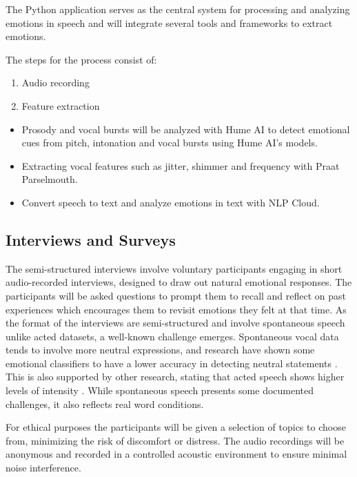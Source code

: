 The Python application serves as the central system for processing and analyzing emotions in speech and will integrate several tools and frameworks to extract emotions.

The steps for the process consist of:

\begin{enumerate}
    \item Audio recording
    \item Feature extraction
\end{enumerate}

\begin{itemize}
    \item Prosody and vocal bursts will be analyzed with Hume AI to detect emotional cues from pitch, intonation and vocal bursts using Hume AI’s models.
    \item Extracting vocal features such as jitter, shimmer and frequency with Praat Parselmouth.
    \item Convert speech to text and analyze emotions in text with NLP Cloud.
\end{itemize}


\subsection{Interviews and Surveys}
\label{sec:theo-interviews}

The semi-structured interviews involve voluntary participants engaging in short audio-recorded interviews, designed to draw out natural emotional responses. The participants will be asked questions to prompt them to recall and reflect on past experiences which encourages them to revisit emotions they felt at that time. 
As the format of the interviews are semi-structured and involve spontaneous speech unlike acted datasets, a well-known challenge emerges. Spontaneous vocal data tends to involve more neutral expressions, and research have shown some emotional classifiers to have a lower accuracy in detecting neutral statements \autocite{Cao2015}. This is also supported by other research, stating that acted speech shows higher levels of intensity \autocite{Chakraborty2016}. While spontaneous speech presents some documented challenges, it also reflects real word conditions.

For ethical purposes the participants will be given a selection of topics to choose from, minimizing the risk of discomfort or distress. The audio recordings will be anonymous and recorded in a controlled acoustic environment to ensure minimal noise interference.

